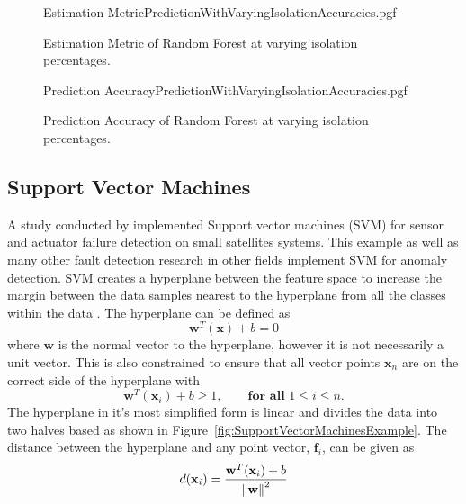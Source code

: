 \begin{figure}[!htb]
	\centering
	{Estimation MetricPredictionWithVaryingIsolationAccuracies.pgf}
	
	\caption{Estimation Metric of Random Forest at varying isolation percentages.}
	\label{fig:RandomForestWithVaryingIsolationEstimation}
\end{figure}

\begin{figure}[!htb]
	\centering
	{Prediction AccuracyPredictionWithVaryingIsolationAccuracies.pgf}
	
	\caption{Prediction Accuracy of Random Forest at varying isolation percentages.}
	\label{fig:RandomForestWithVaryingIsolationPrediction}
\end{figure}

\subsection{Support Vector Machines}
A study conducted by \cite{colagrossi2022fault} implemented Support vector machines (SVM) for sensor and actuator failure detection on small satellites systems. This example as well as many other fault detection research in other fields implement SVM for anomaly detection. SVM creates a hyperplane between the feature space to increase the margin between the data samples nearest to the hyperplane from all the classes within the data \cite{hearst1998support, meyer2015support}. The hyperplane can be defined as
\begin{equation}
\mathbf{w}^T(\mathbf{x}) + b = 0
\end{equation}
where $\mathbf{w}$ is the normal vector to the hyperplane, however it is not necessarily a unit vector. This is also constrained to ensure that all vector points $\mathbf{x}_n$ are on the correct side of the hyperplane with 
\begin{equation}
\mathbf{w}^T(\mathbf{x}_i) + b \geq 1, \qquad \textbf{for all }  1 \leq i \leq n.
\end{equation}
The hyperplane in it's most simplified form is linear and divides the data into two halves based as shown in Figure~\ref{fig:SupportVectorMachinesExample}. The distance between the hyperplane and any point vector, $\mathbf{f}_i$, can be given as
\begin{equation}
d(\mathbf{x}_i) = \frac{\mathbf{w}^T(\mathbf{x}_i) + b}{\left\lVert\mathbf{w}\right\rVert^2}
\end{equation}

